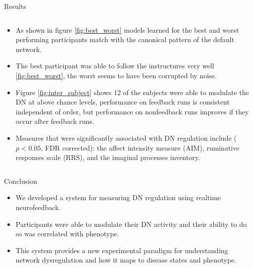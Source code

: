 \documentclass[final,hyperref={pdfpagelabels=false}]{beamer}
\begin{document}
\begin{frame}
\begin{columns}
\begin{column}{.5\textwidth}
{\begin{block}{Results}
\begin{column}{.49\textwidth}
                  \begin{itemize}
                       \item As shown in figure \ref{fig:best_worst} models learned for the best and worst performing participants match
                             with the canonical pattern of the default network.
                       \item The best participant was able to follow the instructures very well \ref{fig:best_worst}, the worst seems
                             to have been corrupted by noise.
                       \item Figure \ref{fig:inter_subject} shows 12 of the subjects were able to modulate the DN at above chance levels,
                             performance on feedback runs is consistent independent of order, but performance on nonfeedback runs improves
                             if they occur after feedback runs.
                       \item Measures that were significantly associated with DN regulation include ($p<0.05$, FDR corrected):  the affect intensity measure (AIM), ruminative responses scale (RRS), and the imaginal processes inventory. 
                  \end{itemize}
              \end{column}
            \end{block}
            \begin{block}{Conclusion}
              \begin{itemize}
                   \item We developed a system for measuring DN regulation using realtime neurofeedback. 
                   \item Participants were able to modulate their DN activity and their ability to do so was correlated with phenotype. 
                   \item This system provides a new experimental paradigm for understanding network dysregulation and how it maps to 
                        disease states and phenotype.
                   

\end{itemize}
\end{block}}
\end{column}
\end{columns}
\end{frame}
\end{document}
